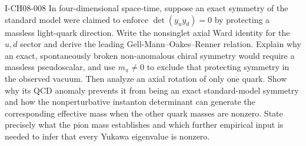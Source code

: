 \begin{exercise}{I-CH08-008}
In four-dimensional space-time, suppose an exact symmetry of the standard model were claimed to enforce
$\det(y_uy_d)=0$ by protecting a massless light-quark direction.  Write the
nonsinglet axial Ward identity for the $u,d$ sector and derive the leading
Gell-Mann--Oakes--Renner relation.  Explain why an exact, spontaneously broken
non-anomalous chiral symmetry would require a massless pseudoscalar, and use
$m_\pi\ne0$ to exclude that protecting symmetry in the observed vacuum.
Then analyze an axial rotation of only one quark.  Show why its QCD anomaly
prevents it from being an exact standard-model symmetry and how the
nonperturbative instanton determinant can generate the corresponding effective
mass when the other quark masses are nonzero.  State precisely what the pion
mass establishes and which further empirical input is needed to infer that
every Yukawa eigenvalue is nonzero.
\end{exercise}
